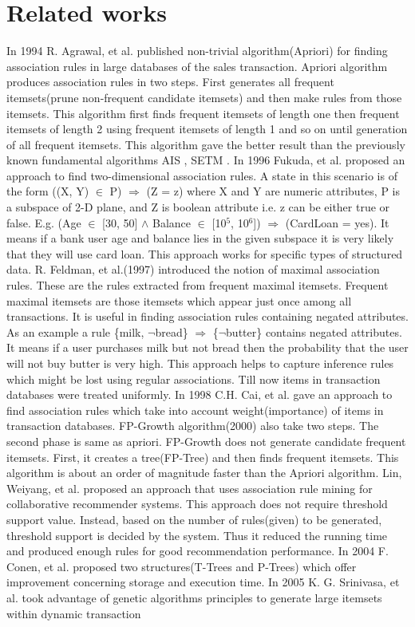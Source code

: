 \documentclass[review]{elsarticle}
\begin{document}
\section{Related works}
In 1994 R. Agrawal, et al. published non-trivial algorithm(Apriori) \cite{fastapriori} for finding association rules in large databases of the sales transaction. Apriori algorithm produces association rules in two steps. First generates all frequent itemsets(prune non-frequent candidate itemsets) and then make rules from those itemsets. This algorithm first finds frequent itemsets of length one then frequent itemsets of length 2 using frequent itemsets of length 1 and so on until generation of all frequent itemsets. This algorithm gave the better result than the previously known fundamental algorithms AIS \cite{ais}, SETM \citep{setm}. In 1996 Fukuda, et al. \cite{2darules} proposed an approach to find two-dimensional association rules. A state in this scenario is of the form ((X, Y) $\in$ P) $\Rightarrow$ (Z = z) where X and Y are numeric attributes, P is a subspace of 2-D plane, and Z is boolean attribute i.e. z can be either true or false. E.g. (Age $\in$ [30, 50] $\wedge$ Balance $\in$ [10$^{5}$, 10$^{6}$]) $\Rightarrow$ (CardLoan = yes). It means if a bank user age and balance lies in the given subspace it is very likely that they will use card loan. This approach works for specific types of structured data. R. Feldman, et al.(1997) \cite{massociation} introduced the notion of maximal association rules. These are the rules extracted from frequent maximal itemsets. Frequent maximal itemsets are those itemsets which appear just once among all transactions. It is useful in finding association rules containing negated attributes. As an example a rule \{milk, $\neg$bread\} $\Rightarrow$ \{$\neg$butter\} contains negated attributes. It means if a user purchases milk but not bread then the probability that the user will not buy butter is very high. This approach helps to capture inference rules which might be lost using regular associations. Till now items in transaction databases were treated uniformly. In 1998 C.H. Cai, et al. \cite{weightedassociation} gave an approach to find association rules which take into account weight(importance) of items in transaction databases. FP-Growth algorithm(2000) \cite{fpgrowth} also take two steps. The second phase is same as apriori. FP-Growth does not generate candidate frequent itemsets. First, it creates a tree(FP-Tree) and then finds frequent itemsets. This algorithm is about an order of magnitude faster than the Apriori algorithm. Lin, Weiyang, et al. \cite{Lin2002} proposed an approach that uses association rule mining for collaborative recommender systems. This approach does not require threshold support value. Instead, based on the number of rules(given) to be generated, threshold support is decided by the system. Thus it reduced the running time and produced enough rules for good recommendation performance. In 2004 F. Conen, et al. \cite{ptree} proposed two structures(T-Trees and P-Trees) which offer improvement concerning storage and execution time. In 2005 K. G. Srinivasa, et al. \cite{genetic} took advantage of genetic algorithms principles to generate large itemsets within dynamic transaction 
\end{document}
